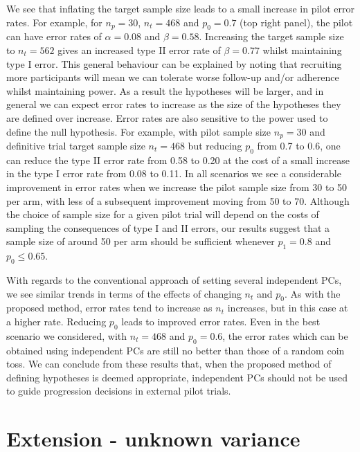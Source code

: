 \documentclass{article}
\begin{document}
We see that inflating the target sample size leads to a small increase in pilot error rates. For example, for $n_p = 30$, $n_t = 468$ and $p_0 = 0.7$ (top right panel), the pilot can have error rates of $\alpha = 0.08$ and $\beta = 0.58$. Increasing the target sample size to $n_t = 562$ gives an increased type II error rate of $\beta = 0.77$ whilst maintaining type I error. This general behaviour can be explained by noting that recruiting more participants will mean we can tolerate worse follow-up and/or adherence whilst maintaining power. As a result the hypotheses will be larger, and in general we can expect error rates to increase as the size of the hypotheses they are defined over increase. Error rates are also sensitive to the power used to define the null hypothesis. For example, with pilot sample size $n_p = 30$ and definitive trial target sample size $n_t = 468$ but reducing $p_0$ from 0.7 to 0.6, one can reduce the type II error rate from 0.58 to 0.20 at the cost of a small increase in the type I error rate from 0.08 to 0.11. In all scenarios we see a considerable improvement in error rates when we increase the pilot sample size from 30 to 50 per arm, with less of a subsequent improvement moving from 50 to 70. Although the choice of sample size for a given pilot trial will depend on the costs of sampling the consequences of type I and II errors, our results suggest that a sample size of around 50 per arm should be sufficient whenever $p_1 = 0.8$ and $p_0 \leq 0.65$.

With regards to the conventional approach of setting several independent PCs, we see similar trends in terms of the effects of changing $n_t$ and $p_0$. As with the proposed method, error rates tend to increase as $n_t$ increases, but in this case at a higher rate. Reducing $p_0$ leads to improved error rates. Even in the best scenario we considered, with $n_t = 468$ and $p_0 = 0.6$, the error rates which can be obtained using independent PCs are still no better than those of a random coin toss. We can conclude from these results that, when the proposed method of defining hypotheses is deemed appropriate, independent PCs should not be used to guide progression decisions in external pilot trials.

\section{Extension - unknown variance}\label{sec:extension}
\end{document}

